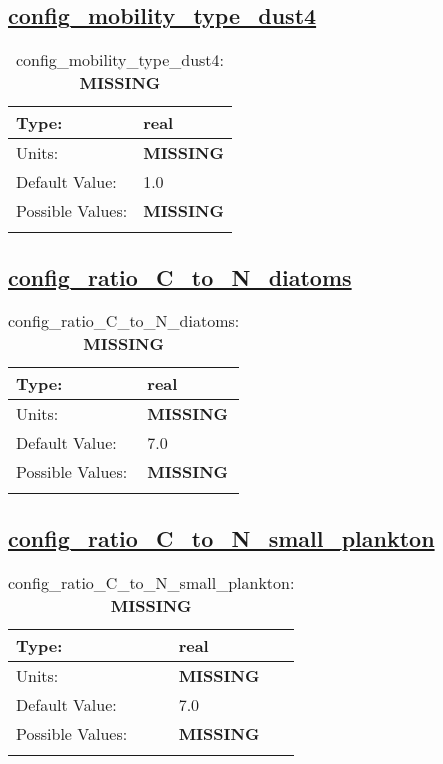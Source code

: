 \subsection[config\_mobility\_type\_dust4]{\hyperref[sec:nm_tab_biogeochemistry]{config\_mobility\_type\_dust4}}
\label{subsec:nm_sec_config_mobility_type_dust4}
\begin{center}
\begin{longtable}{| p{2.0in} || p{4.0in} |}
    \hline
    Type: & real \\
    \hline
    Units: & {\bf \color{red} MISSING} \\
    \hline
    Default Value: & 1.0 \\
    \hline
    Possible Values: & {\bf \color{red} MISSING} \\
    \hline
    \caption{config\_mobility\_type\_dust4: {\bf \color{red} MISSING}}
\end{longtable}
\end{center}
\subsection[config\_ratio\_C\_to\_N\_diatoms]{\hyperref[sec:nm_tab_biogeochemistry]{config\_ratio\_C\_to\_N\_diatoms}}
\label{subsec:nm_sec_config_ratio_C_to_N_diatoms}
\begin{center}
\begin{longtable}{| p{2.0in} || p{4.0in} |}
    \hline
    Type: & real \\
    \hline
    Units: & {\bf \color{red} MISSING} \\
    \hline
    Default Value: & 7.0 \\
    \hline
    Possible Values: & {\bf \color{red} MISSING} \\
    \hline
    \caption{config\_ratio\_C\_to\_N\_diatoms: {\bf \color{red} MISSING}}
\end{longtable}
\end{center}
\subsection[config\_ratio\_C\_to\_N\_small\_plankton]{\hyperref[sec:nm_tab_biogeochemistry]{config\_ratio\_C\_to\_N\_small\_plankton}}
\label{subsec:nm_sec_config_ratio_C_to_N_small_plankton}
\begin{center}
\begin{longtable}{| p{2.0in} || p{4.0in} |}
    \hline
    Type: & real \\
    \hline
    Units: & {\bf \color{red} MISSING} \\
    \hline
    Default Value: & 7.0 \\
    \hline
    Possible Values: & {\bf \color{red} MISSING} \\
    \hline
    \caption{config\_ratio\_C\_to\_N\_small\_plankton: {\bf \color{red} MISSING}}
\end{longtable}
\end{center}
